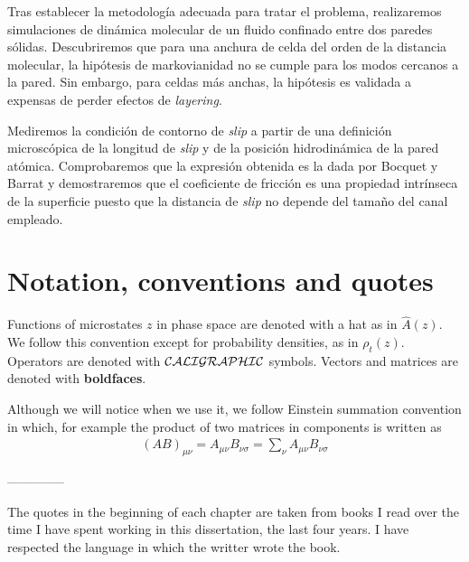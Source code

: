 \documentclass[b5paper,openright,10pt]{book}
\begin{document}
Tras establecer la metodología adecuada para tratar el problema, realizaremos simulaciones de dinámica molecular de un fluido confinado entre dos paredes sólidas. Descubriremos que para una anchura de celda del orden de la distancia molecular, la hipótesis de markovianidad no se cumple para los modos cercanos a la pared. Sin embargo, para celdas más anchas, la hipótesis es validada a expensas de perder efectos de \textit{layering}. 

Mediremos la condición de contorno de \textit{slip} a partir de una definición microscópica de la longitud de \textit{slip} y de la posición hidrodinámica de la pared atómica. Comprobaremos que la expresión obtenida es la dada por Bocquet y Barrat \cite{Bocquet1994} y demostraremos que el coeficiente de fricción es una propiedad intrínseca de la superficie puesto que la distancia de \textit{slip} no depende del tamaño del canal empleado. 


\chapter*{Notation, conventions and quotes}

Functions of microstates $z$ in phase space are denoted with a hat as in $\hat{A}(z)$. We follow this convention except for probability densities, as in $\rho_t(z)$. Operators are denoted with ${\cal CALIGRAPHIC}$ symbols. Vectors and matrices are denoted with {\bf boldfaces}.

Although we will notice when we use it, we follow Einstein summation convention in which, for example the product of two matrices in components is written as
\begin{align}
    (AB)_{\mu\nu} = A_{\mu\nu}B_{\nu\sigma}=\sum_{\nu}A_{\mu\nu}B_{\nu\sigma} \nonumber
\end{align}

--------------

The quotes in the beginning of each chapter are taken from books I read over the time I have spent working in this dissertation, the last four years. I have respected the language in which the writter wrote the book. 

\setcounter{chapter}{-1}
\end{document}
